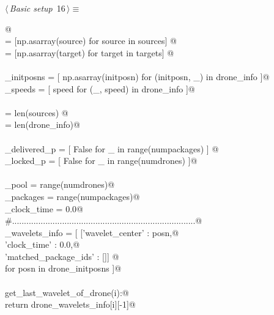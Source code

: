 \documentclass[10pt, english, oneside]{report}
\begin{document}
\begin{flushleft} \small\label{scrap15}\raggedright\small
{} $\langle\,${\itshape Basic setup}\nobreak\ {\footnotesize {16}}$\,\rangle\equiv$
\vspace{-1ex}
\begin{list}{}{} \item
\mbox{}\verb@ @\\
\mbox{}\verb@sources             = [np.asarray(source) for source in sources] @\\
\mbox{}\verb@targets             = [np.asarray(target) for target in targets] @\\
\mbox{}\verb@@\\
\mbox{}\verb@drone_initposns     = [ np.asarray(initposn) for (initposn, _) in drone_info ]@\\
\mbox{}\verb@drone_speeds        = [ speed                for (_,    speed) in drone_info ]@\\
\mbox{}\verb@@\\
\mbox{}\verb@numpackages         = len(sources) @\\
\mbox{}\verb@numdrones           = len(drone_info)@\\
\mbox{}\verb@@\\
\mbox{}\verb@package_delivered_p = [ False for _ in range(numpackages) ] @\\
\mbox{}\verb@drone_locked_p      = [ False for _ in range(numdrones)   ]@\\
\mbox{}\verb@@\\
\mbox{}\verb@drone_pool          = range(numdrones)@\\
\mbox{}\verb@remaining_packages  = range(numpackages)@\\
\mbox{}\verb@global_clock_time   = 0.0@\\
\mbox{}\verb@#.............................................................................@\\
\mbox{}\verb@drone_wavelets_info = [ [{'wavelet_center'        : posn,@\\
\mbox{}\verb@                          'clock_time'            : 0.0,@\\
\mbox{}\verb@                          'matched_package_ids'   : []}] @\\
\mbox{}\verb@                        for posn in drone_initposns ]@\\
\mbox{}\verb@@\\
\mbox{}\verb@def get_last_wavelet_of_drone(i):@\\
\mbox{}\verb@         return drone_wavelets_info[i][-1]@\\

\end{list}
\end{flushleft}
\end{document}
